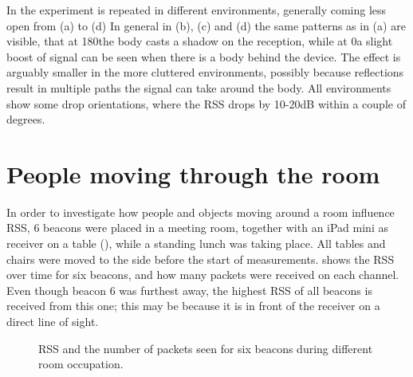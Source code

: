In  the experiment is repeated in different environments, generally coming less open from (a) to (d)
In general in (b), (c) and (d) the same patterns as in (a) are visible, that at 180\tdegree the body casts a shadow on the reception, while at 0\tdegree a slight boost of signal can be seen when there is a body behind the device.
The effect is arguably smaller in the more cluttered environments, possibly because reflections result in multiple paths the signal can take around the body.
All environments show some drop orientations, where the RSS drops by 10-20dB within a couple of degrees.

\section{People moving through the room}
\label{sec:rss-busyroom}

In order to investigate how people and objects moving around a room influence RSS, 6 beacons were placed in a meeting room, together with an iPad mini as receiver on a table (), while a standing lunch was taking place.
All tables and chairs were moved to the side before the start of measurements.
 shows the RSS over time for six beacons, and how many packets were received on each channel.
Even though beacon 6 was furthest away, the highest RSS of all beacons is received from this one; this may be because it is in front of the receiver on a direct line of sight.

\begin{figure}[p]
    \begin{subfigure}[b]{0.5\textwidth}
    \end{subfigure}
    \begin{subfigure}[b]{0.5\textwidth}
    \end{subfigure}
    \begin{subfigure}[b]{0.5\textwidth}
    \end{subfigure}
    \begin{subfigure}[b]{0.5\textwidth}
    \end{subfigure}
    \begin{subfigure}[b]{0.5\textwidth}
    \end{subfigure}
    \begin{subfigure}[b]{0.5\textwidth}
    \end{subfigure}
    \caption{RSS and the number of packets seen for six beacons during different room occupation.}
    \label{fig:rss-busyroom}
\end{figure}

